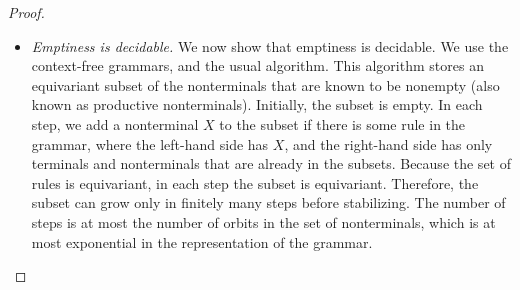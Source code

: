 \begin{proof}
\begin{itemize}
	  	\item \emph{Emptiness is decidable.} We now show that emptiness is decidable. We use the context-free grammars, and the usual algorithm. This algorithm stores an equivariant subset of the nonterminals that are known to be nonempty (also known as productive nonterminals). Initially, the subset is empty. In each step, we add a nonterminal $X$ to the subset if there is some rule in the grammar, where the left-hand side has $X$, and the right-hand side has only terminals and nonterminals that are already in the subsets. Because the set of rules is equivariant, in each step the subset is equivariant. Therefore, the subset can grow only in finitely many steps before stabilizing. The number of steps is at most the number of orbits in the set of nonterminals, which is at most exponential in the representation of the grammar.
	\end{itemize}
\end{proof}
	

	



	\exercisepart

